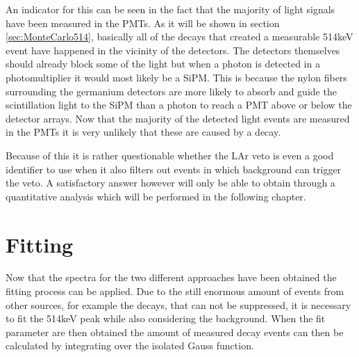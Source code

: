\documentclass[encoding=utf8,british]{tumphthesis}
\begin{document}
An indicator for this can be seen in the fact that the majority of light signals have been measured in the PMTs.
As it will be shown in section \ref{sec:MonteCarlo514}, basically all of the decays that created a measurable 514keV event have happened in the vicinity of the detectors.
The detectors themselves should already block some of the light but when a photon is detected in a photomultiplier it would most likely be a SiPM.
This is because the nylon fibers surrounding the germanium detectors are more likely to absorb and guide the scintillation light to the SiPM than a photon to reach a PMT above or below the detector arrays.
Now that the majority of the detected light events are measured in the PMTs it is very unlikely that these are caused by a \Kr decay.

Because of this it is rather questionable whether the LAr veto is even a good identifier to use when it also filters out events in which background can trigger the veto.
A satisfactory answer however will only be able to obtain through a quantitative analysis which will be performed in the following chapter.
\\

\section{Fitting}
\label{sec:Fitting}

Now that the spectra for the two different approaches have been obtained the fitting process can be applied.
Due to the still enormous amount of events from other sources, for example the  decays, that can not be suppressed, it is necessary to fit the 514keV peak while also considering the background.
When the fit parameter are then obtained the amount of measured \Kr decay events can then be calculated by integrating over the isolated Gauss function.
\\
\end{document}
